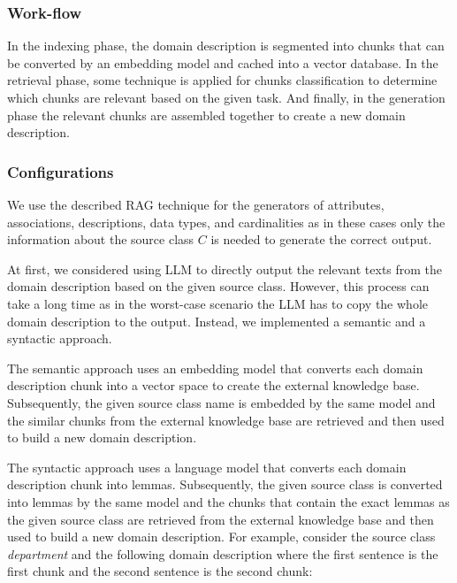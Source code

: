 \subsubsection{Work-flow}

In the indexing phase, the domain description is segmented into chunks that can be converted by an embedding model and cached into a vector database. In the retrieval phase, some technique is applied for chunks classification to determine which chunks are relevant based on the given task. And finally, in the generation phase the relevant chunks are assembled together to create a new domain description.


\subsubsection{Configurations}
\label{sec:rag_configurations}

We use the described RAG technique for the generators of attributes, associations, descriptions, data types, and cardinalities as in these cases only the information about the source class $C$ is needed to generate the correct output.

At first, we considered using LLM to directly output the relevant texts from the domain description based on the given source class. However, this process can take a long time as in the worst-case scenario the LLM has to copy the whole domain description to the output. Instead, we implemented a semantic and a syntactic approach.


The semantic approach uses an embedding model that converts each domain description chunk into a vector space to create the external knowledge base. Subsequently, the given source class name is embedded by the same model and the similar chunks from the external knowledge base are retrieved and then used to build a new domain description.

The syntactic approach uses a language model that converts each domain description chunk into lemmas. Subsequently, the given source class is converted into lemmas by the same model and the chunks that contain the exact lemmas as the given source class are retrieved from the external knowledge base and then used to build a new domain description. For example, consider the source class \textit{department} and the following domain description where the first sentence is the first chunk and the second sentence is the second chunk: \\

